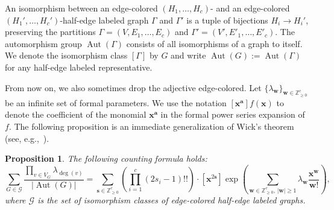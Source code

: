 \documentclass[a4paper,oneside]{amsart}
\newcommand{\bb}[1]{\boldsymbol{#1}}
\numberwithin{theorem}{section}
\newtheorem{proposition}[theorem]{Proposition}
\theoremstyle{remark}
\newcommand{\GG}{\mathcal{G}}
\newcommand{\Z}{\mathbb{Z}}
\DeclareMathOperator{\Aut}{Aut}
\begin{document}
An isomorphism between an edge-colored $(H_1,\dots,H_c)$- and an edge-colored $(H_1',\dots,H_c')$-half-edge labeled graph $\Gamma$ and $\Gamma'$  is a tuple of bijections $H_i \rightarrow H_i'$, preserving the partitions $\Gamma = (V, E_{1},\dots, E_{c})$ and $\Gamma' = (V', E'_{1},\dots, E'_{c})$. 
The automorphism group $\Aut(\Gamma)$ consists of all isomorphisms of a graph to itself. We denote the isomorphism class $[\Gamma]$ by $G$ and write $\Aut(G) := \Aut(\Gamma)$ for any half-edge labeled representative.

From now on, we also sometimes drop the adjective edge-colored.
Let $\{\lambda_{\bb w}\}_{\bb w \in \Z_{\geq 0}^c}$ be an infinite set of formal parameters. We use the notation $[\bb x^{\bb a}]f(\bb{x})$ to denote the coefficient of the monomial $\bb x^{\bb a}$ in the formal power series expansion of $f$.
The following proposition is an immediate generalization of Wick's theorem (see, e.g.,~\cite{MR603127}).

\begin{proposition}
  \label{prop:gf_graphs}
The following counting formula holds:
  \begin{equation}\label{eq:gf_graphs}
    \sum_{G \in \GG} \frac{\prod_{v\in V_G} \lambda_{\deg(v)}}{|\Aut(G)|} =  
\sum_{\bb{s} \in \Z_{\geq 0}^c} 
\left(\prod_{i=1}^c (2s_i-1)!! \right)
\cdot [\bb{x}^{2\bb{s}}]\exp\left( \sum_{\bb{w}\in \Z^c_{\geq 0},\, |\bb{w}| \geq 1} \lambda_{\bb{w}} \frac{\bb{x}^{\bb{w}}}{\bb{w}!} \right),
  \end{equation}
where $\GG$ is the set of isomorphism classes of edge-colored half-edge labeled graphs. 
\end{proposition}
\end{document}
